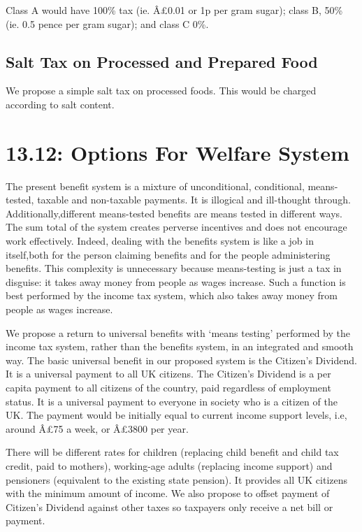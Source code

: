 \documentclass[]{tufte-handout}
\begin{document}
Class A would have 100\% tax (ie. Â£0.01 or 1p per gram sugar); class B,
50\% (ie. 0.5 pence per gram sugar); and class C 0\%.

\hypertarget{salt-tax-on-processed-and-prepared-food}{%
\subsection{Salt Tax on Processed and Prepared
Food}\label{salt-tax-on-processed-and-prepared-food}}

We propose a simple salt tax on processed foods. This would be charged
according to salt content.

\hypertarget{options-for-welfare-system}{%
\section{13.12: Options For Welfare
System}\label{options-for-welfare-system}}

The present benefit system is a mixture of unconditional, conditional,
means-tested, taxable and non-taxable payments. It is illogical and
ill-thought through. Additionally,different means-tested benefits are
means tested in different ways. The sum total of the system creates
perverse incentives and does not encourage work effectively. Indeed,
dealing with the benefits system is like a job in itself,both for the
person claiming benefits and for the people administering benefits. This
complexity is unnecessary because means-testing is just a tax in
disguise: it takes away money from people as wages increase. Such a
function is best performed by the income tax system, which also takes
away money from people as wages increase.

We propose a return to universal benefits with `means testing' performed
by the income tax system, rather than the benefits system, in an
integrated and smooth way. The basic universal benefit in our proposed
system is the Citizen's Dividend. It is a universal payment to all UK
citizens. The Citizen's Dividend is a per capita payment to all citizens
of the country, paid regardless of employment status. It is a universal
payment to everyone in society who is a citizen of the UK. The payment
would be initially equal to current income support levels, i.e, around
Â£75 a week, or Â£3800 per year.

There will be different rates for children (replacing child benefit and
child tax credit, paid to mothers), working-age adults (replacing income
support) and pensioners (equivalent to the existing state pension). It
provides all UK citizens with the minimum amount of income. We also
propose to offset payment of Citizen's Dividend against other taxes so
taxpayers only receive a net bill or payment.
\end{document}
